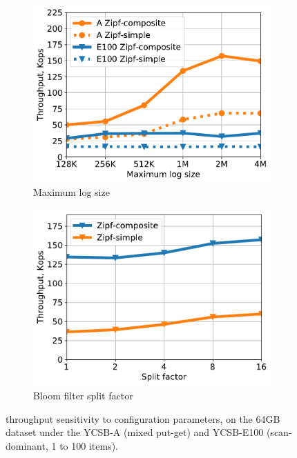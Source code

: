 \begin{figure}[htb]
\centering
\begin{subfigure}{0.49\linewidth}
\includegraphics[width=\textwidth]{figs/max_log_size_line.pdf}
\caption{Maximum log size}
\label{fig:params:log}
\end{subfigure}
\begin{subfigure}{0.49\linewidth}
\includegraphics[width=\textwidth]{figs/Bloom_filter_line.pdf}
\caption{Bloom filter split factor}
\label{fig:params:bf}
\end{subfigure}
\caption{{\sys\/ throughput sensitivity to configuration parameters, on the 64GB dataset under the YCSB-A (mixed put-get) and 
YCSB-E100 (scan-dominant, 1 to 100 items).}}
\label{fig:params}
\end{figure}

